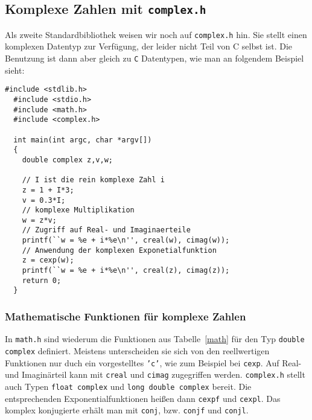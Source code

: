 \subsection{Komplexe Zahlen mit \texttt{complex.h}}

Als zweite Standardbibliothek weisen wir noch auf \texttt{complex.h} hin.
Sie stellt einen komplexen Datentyp zur Verfügung, der leider nicht Teil von C selbst ist.
Die Benutzung ist dann aber gleich zu \texttt{C} Datentypen, wie man an folgendem Beispiel sieht:
\begin{lstlisting}[caption={Beispiel für komplexe Zahlen}, belowcaptionskip=0.3em]
  #include <stdlib.h>
  #include <stdio.h>
  #include <math.h>
  #include <complex.h>
  
  int main(int argc, char *argv[])
  {
    double complex z,v,w;

    // I ist die rein komplexe Zahl i
    z = 1 + I*3;
    v = 0.3*I;
    // komplexe Multiplikation
    w = z*v;
    // Zugriff auf Real- und Imaginaerteile
    printf(``w = %e + i*%e\n'', creal(w), cimag(w));
    // Anwendung der komplexen Exponetialfunktion
    z = cexp(w);
    printf(``w = %e + i*%e\n'', creal(z), cimag(z));
    return 0;
  }
\end{lstlisting}

\subsubsection{Mathematische Funktionen für komplexe Zahlen}

In \texttt{math.h} sind wiederum die Funktionen aus Tabelle~\ref{math} für den Typ \texttt{double complex} definiert.
Meistens unterscheiden sie sich von den reellwertigen Funktionen nur duch ein vorgestelltes \texttt{'c'}, wie zum Beispiel bei \texttt{cexp}.
Auf Real- und Imaginärteil kann mit \texttt{creal} und \texttt{cimag} zugegriffen werden.
\texttt{complex.h} stellt auch Typen \texttt{float complex} und \texttt{long double complex} bereit.
Die entsprechenden Exponentialfunktionen heißen dann \texttt{cexpf} und \texttt{cexpl}.
Das komplex konjugierte erhält man mit \texttt{conj}, bzw. \texttt{conjf} und \texttt{conjl}.
